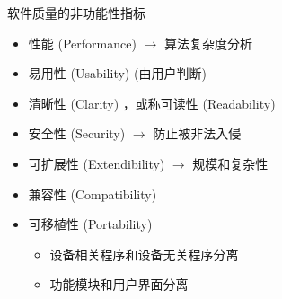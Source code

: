 \documentclass[10pt,t]{beamer}
\begin{document}
\begin{frame}{软件质量的非功能性指标}
\begin{itemize}
    \item 性能 (Performance) $\to$ 算法复杂度分析
    \item 易用性 (Usability) (由用户判断)
    \item 清晰性 (Clarity) ，或称可读性 (Readability)
    \item 安全性 (Security) $\to$ 防止被非法入侵
    \item 可扩展性 (Extendibility) $\to$ 规模和复杂性
    \item 兼容性 (Compatibility)
    \item 可移植性 (Portability)
    \begin{itemize}
        \item 设备相关程序和设备无关程序分离
        \item 功能模块和用户界面分离
    \end{itemize}
\end{itemize}
\end{frame}
\end{document}
